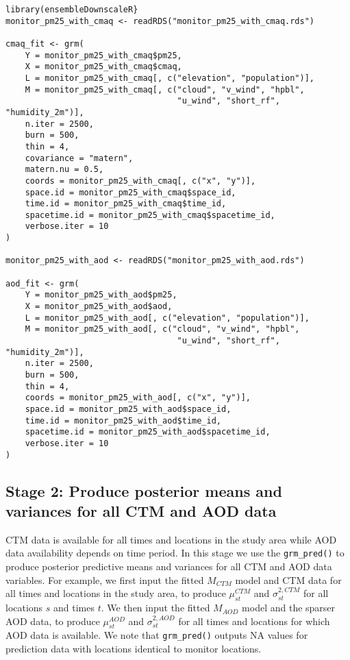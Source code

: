 \documentclass[12pt]{article}
\begin{document}
\begin{lstlisting}
library(ensembleDownscaleR}
monitor_pm25_with_cmaq <- readRDS("monitor_pm25_with_cmaq.rds")

cmaq_fit <- grm(
    Y = monitor_pm25_with_cmaq$pm25,
    X = monitor_pm25_with_cmaq$cmaq,
    L = monitor_pm25_with_cmaq[, c("elevation", "population")],
    M = monitor_pm25_with_cmaq[, c("cloud", "v_wind", "hpbl", 
                                   "u_wind", "short_rf", "humidity_2m")],
    n.iter = 2500,
    burn = 500,
    thin = 4,
    covariance = "matern",
    matern.nu = 0.5,
    coords = monitor_pm25_with_cmaq[, c("x", "y")],
    space.id = monitor_pm25_with_cmaq$space_id,
    time.id = monitor_pm25_with_cmaq$time_id,
    spacetime.id = monitor_pm25_with_cmaq$spacetime_id,
    verbose.iter = 10
)

monitor_pm25_with_aod <- readRDS("monitor_pm25_with_aod.rds")

aod_fit <- grm(
    Y = monitor_pm25_with_aod$pm25,
    X = monitor_pm25_with_aod$aod,
    L = monitor_pm25_with_aod[, c("elevation", "population")],
    M = monitor_pm25_with_aod[, c("cloud", "v_wind", "hpbl", 
                                   "u_wind", "short_rf", "humidity_2m")],
    n.iter = 2500,
    burn = 500,
    thin = 4,
    coords = monitor_pm25_with_aod[, c("x", "y")],
    space.id = monitor_pm25_with_aod$space_id,
    time.id = monitor_pm25_with_aod$time_id,
    spacetime.id = monitor_pm25_with_aod$spacetime_id,
    verbose.iter = 10
)

\end{lstlisting}


\subsection*{Stage 2: Produce posterior means and variances for all CTM and AOD data}
CTM data is available for all times and locations in the study area while AOD data availability depends on time period. 
In this stage we use the \texttt{grm\_pred()} to produce posterior predictive means and variances for all CTM and AOD data variables. 
For example, we first input the fitted $M_{CTM}$ model and CTM data for all times and locations in the study area, to produce $\mu^{CTM}_{st}$ and $\sigma^{2, CTM}_{st}$ for all locations $s$ and times $t$. 
We then input the fitted $M_{AOD}$ model and the sparser AOD data, to produce $\mu^{AOD}_{st}$ and $\sigma^{2, AOD}_{st}$ for all times and locations for which AOD data is available. 
We note that \texttt{grm\_pred()} outputs NA values for prediction data with locations identical to monitor locations. 
\end{document}
